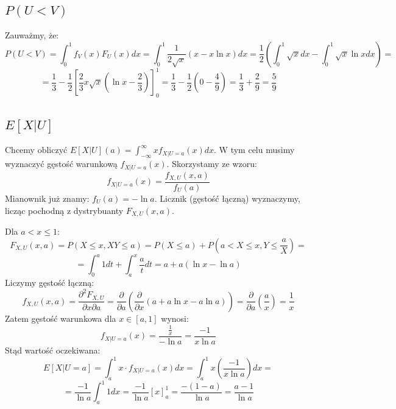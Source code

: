 \subsection{\(P(U<V)\)}
Zauważmy, że:
\[ P(U< V) = \int_0^1 f_V(x) F_U(x) dx = \int^1_0 \frac{1}{2\sqrt{x}}(x - x\ln x) dx = \frac{1}{2} \left( \int_0^1 \sqrt{x} dx - \int_0^1 \sqrt{x} \ln x dx \right)=\]
\[= \frac{1}{3} - \frac{1}{2}\left[\frac{2}{3}x\sqrt{x}\left(\ln x - \frac{2}{3}\right) \right]^1_0 = \frac{1}{3} - \frac{1}{2} \left( 0 - \frac{4}{9} \right) = \frac{1}{3} + \frac{2}{9} = \frac{5}{9}\]
\subsection{\(E[X | U]\)}
Chcemy obliczyć \(E[X | U](a) = \int_{-\infty}^{\infty} x f_{X|U=a}(x) dx\). W tym celu musimy wyznaczyć gęstość warunkową \(f_{X|U=a}(x)\).
Skorzystamy ze wzoru:
\[f_{X|U=a}(x) = \frac{f_{X,U}(x,a)}{f_U(a)}\]
Mianownik już znamy: \(f_U(a) = -\ln a\). Licznik (gęstość łączną) wyznaczymy, licząc pochodną  z dystrybuanty  \(F_{X,U}(x,a)\).

Dla \(a < x \le 1\):
\[F_{X,U}(x, a) = P(X \le x, XY \le a) = P(X \le a) + P(a < X \le x, Y \le \frac{a}{X}) =\]
\[= \int_0^a 1 dt + \int_a^x \frac{a}{t} dt = a + a(\ln x - \ln a)\]
Liczymy gęstość łączną:
\[f_{X,U}(x, a) = \frac{\partial^2 F_{X,U}}{\partial x \partial a} = \frac{\partial}{\partial a} \left( \frac{\partial}{\partial x} (a + a\ln x - a\ln a) \right) = \frac{\partial}{\partial a} \left( \frac{a}{x} \right) = \frac{1}{x}\]
Zatem gęstość warunkowa dla \(x \in [a, 1]\) wynosi:
\[f_{X|U=a}(x) = \frac{\frac{1}{x}}{-\ln a} = \frac{-1}{x \ln a}\]
Stąd wartość oczekiwana:
\[E[X | U=a] = \int_a^1 x \cdot f_{X|U=a}(x) dx = \int_a^1 x \left( \frac{-1}{x \ln a} \right) dx =\]
\[= \frac{-1}{\ln a} \int_a^1 1 dx = \frac{-1}{\ln a} [x]_a^1 = \frac{-(1-a)}{\ln a} = \frac{a-1}{\ln a}\]
